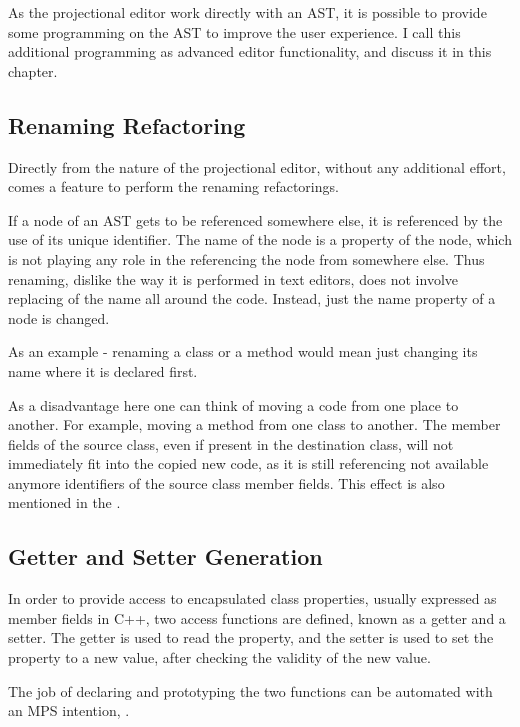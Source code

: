 
As the projectional editor work directly with an  AST, it is possible to provide some programming on the AST
to improve the user experience. I call this additional programming as advanced editor functionality, and 
discuss it in this chapter.

\subsection{Renaming Refactoring}
Directly from the nature of the projectional editor, without any additional effort, comes a feature to 
perform the renaming refactorings.

If a node of an AST gets to be referenced somewhere else, it is referenced by the use of its unique
identifier. The name of the node is a property of the node, which is not playing any role in the
referencing the node from somewhere else. Thus renaming, dislike the way it is performed in text
editors, does not involve replacing of the name all around the code. Instead, just the name property 
of a node is changed.

As an example - renaming a class or a method would mean just changing its name where it is declared first.

As a disadvantage here one can think of moving a code from one place to another. For example, moving 
a method from one class to another. The member fields of the source class, even if present in the destination
class, will not immediately fit into the copied new code, as it is still referencing not available anymore
identifiers of the source class member fields. This effect is also mentioned in the .


\subsection{Getter and Setter Generation}
\label{section:getterandsetter}

In order to provide access to encapsulated class properties, usually expressed as member fields in C++, 
two access functions are defined, known as a getter and a setter. The getter is used to read the property,
and the setter is used to set the property to a new value, after checking the validity of the new value.

The job of declaring and prototyping the two functions can be automated with an MPS intention, .

